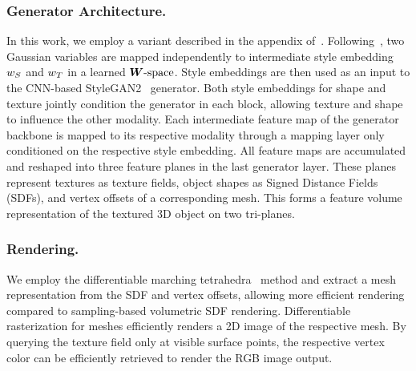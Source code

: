 \subsubsection{Generator Architecture.} In this work, we employ a variant described in the appendix of~\cite{gao2022get3d}. Following~\cite{karras2019styleGAN,karras2020styleGAN2}, two Gaussian variables are mapped independently to intermediate style embedding $\boldmath{w}_S$ and $\boldmath{w}_T$ in a learned $\boldmath{W}\text{-space}$. Style embeddings are then used as an input to the CNN-based StyleGAN2~\cite{karras2020styleGAN2} generator. Both style embeddings for shape and texture jointly condition the generator in each block, allowing texture and shape to influence the other modality. Each intermediate feature map of the generator backbone is mapped to its respective modality through a mapping layer only conditioned on the respective style embedding. All feature maps are accumulated and reshaped into three feature planes in the last generator layer. These planes represent textures as texture fields, object shapes as Signed Distance Fields (SDFs), and vertex offsets of a corresponding mesh. This forms a feature volume representation of the textured 3D object on two tri-planes. 




\subsubsection{Rendering.} We employ the differentiable marching tetrahedra~\cite{shen2021dmtet} method and extract a mesh representation from the SDF and vertex offsets, allowing more efficient rendering compared to sampling-based volumetric SDF rendering. Differentiable rasterization for meshes efficiently renders a 2D image of the respective mesh. By querying the texture field only at visible surface points, the respective vertex color can be efficiently retrieved to render the RGB image output.


